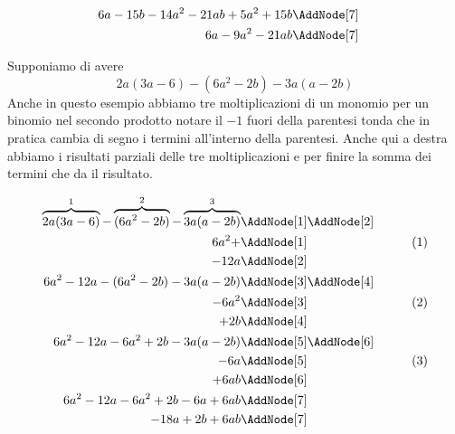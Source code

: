 \begin{esempio}
\begin{NodesList}
\begin{align*}
		6a-15b-14a^2-21ab+5a^2+15b&\nonumber\AddNode[7]&\\   
		6a-9a^2-21ab&\nonumber\AddNode[7] 
	\end{align*}
\end{NodesList}
\end{esempio}
\begin{esempio}
Supponiamo di avere \[2a(3a-6)-(6a^2-2b)-3a(a-2b)\]
Anche in questo esempio abbiamo tre moltiplicazioni di un monomio per un binomio nel secondo prodotto notare il $-1$ fuori della parentesi tonda che in pratica cambia di segno i termini all'interno della parentesi. Anche qui a destra abbiamo  i risultati parziali delle tre moltiplicazioni e per finire la somma dei termini che da il risultato.
\begin{NodesList}
	\begin{align*}
		\overbrace{2a(3a-6)}^{1}-\overbrace{(6a^2-2b)}^{2}-\overbrace{3a(a-2b)}^{3}&\AddNode[1]\AddNode[2]\\
		6a^2+&\AddNode[1]&\tag{1}\\ 
		-12a&\AddNode[2]&\\
		6a^2-12a-(6a^2-2b)-3a(a-2b)&\AddNode[3]\AddNode[4]\\
		-6a^2&\AddNode[3]&\tag{2}\\    
		+2b&\AddNode[4]&\\
		6a^2-12a-6a^2+2b-3a(a-2b)&\AddNode[5]\AddNode[6]\\
		-6a&\AddNode[5]&\tag{3}\\
		+6ab&\AddNode[6]&\\
		6a^2-12a-6a^2+2b-6a+6ab&\AddNode[7]\\   
		-18a+2b+6ab&\AddNode[7]   
	\end{align*}
\end{NodesList}
\end{esempio}
